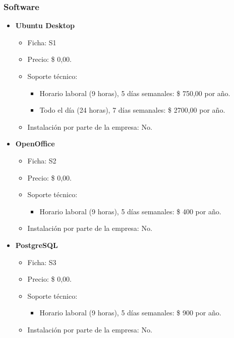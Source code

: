 \subsubsection{Software}
\begin{itemize}
  \item \textbf{Ubuntu Desktop}
    \begin{itemize}
      \item Ficha: S1
      \item Precio: \$ 0,00.
      \item Soporte técnico:
        \begin{itemize}
          \item Horario laboral (9 horas), 5 días semanales: \$ 750,00 por año.
          \item Todo el día (24 horas), 7 días semanales: \$ 2700,00 por año.
        \end{itemize}
      \item Instalación por parte de la empresa: No.
    \end{itemize}
    
  \item \textbf{OpenOffice}
    \begin{itemize}
      \item Ficha: S2
      \item Precio: \$ 0,00.
      \item Soporte técnico:
        \begin{itemize}
          \item Horario laboral (9 horas), 5 días semanales: \$ 400 por año.
        \end{itemize}
      \item Instalación por parte de la empresa: No.
    \end{itemize}
  
  \item \textbf{PostgreSQL}
    \begin{itemize}
      \item Ficha: S3
      \item Precio: \$ 0,00.
      \item Soporte técnico:
        \begin{itemize}
          \item Horario laboral (9 horas), 5 días semanales: \$ 900 por año.
        \end{itemize}
      \item Instalación por parte de la empresa: No.
    \end{itemize}
\end{itemize}

\pagebreak
